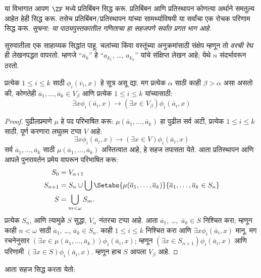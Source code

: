 \documentclass[../../../include/open-logic-section]{subfiles}
\begin{document}

या विभागात आपण $\ZF$ मध्ये प्रतिबिंबन सिद्ध करू. प्रतिबिंबन आणि प्रतिस्थापन कोणत्या अर्थाने समतुल्य आहेत हेही सिद्ध करू. तसेच प्रतिबिंबन/प्रतिस्थापन यांच्या सामर्थ्याविषयी या सर्वांचा एक रोचक परिणाम सिद्ध करू. \emph{सूचना: या पाठ्यपुस्तकातील गणिताचा हा सहजपणे सर्वांत प्रगत भाग आहे.}

सुरुवातीला एक साहाय्यक सिद्धांत पाहू. चलांच्या किंवा वस्तूंच्या अनुक्रमांसाठी संक्षेप म्हणून तो \emph{वरची रेघ} ही लेखनपद्धत वापरतो. म्हणजे ``$\overline{a}_k$'' हे ``$a_{k_1}$, \dots,
$a_{k_n}$'' यांचे संक्षिप्त लेखन आहे; येथे $n$ संदर्भावरून ठरतो.

\begin{lem}
प्रत्येक $1 \leq i \leq k$ साठी $\phi_i(\overline{v}_i, x)$ हे सूत्र असू द्या. मग प्रत्येक $\alpha$ साठी काही $\beta > \alpha$ असा असतो की, कोणतेही $\overline{a}_1,
\ldots, \overline{a}_k \in V_\beta$ आणि प्रत्येक $1 \leq i \leq k$ यांच्यासाठी:
\[
  \exists x\phi_i(\overline{a}_i, x) \rightarrow (\exists x \in V_\beta) \phi_i(\overline{a}_i, x)
\]
\end{lem}

\begin{proof}
पुढीलप्रमाणे $\mu$ हे पद परिभाषित करू: $\mu(\overline{a}_1, \ldots,
\overline{a}_k)$ हा पुढील सर्व अटी, प्रत्येक $1 \leq i \leq k$ साठी, पूर्ण करणारा लघुतम टप्पा $V$ आहे:
\[
\exists x\phi_i(\overline{a}_i, x) \rightarrow (\exists x \in V) \phi_i(\overline{a}_i, x)
\]
सर्व $\overline{a}_1, \ldots, \overline{a}_k$ साठी $\mu(\overline{a}_1, \ldots, \overline{a}_k)$ अस्तित्वात आहे, हे सहज तपासता येते. आता प्रतिस्थापन आणि आपले पुनरावर्तन प्रमेय वापरून परिभाषित करू:
\begin{align*}
  S_0 & = V_{\alpha+1}\\
  S_{n+1} & = S_n \cup \bigcup
  \Setabs{\mu(\overline{a}_1, \ldots, \overline{a}_k)}
  {\overline{a}_1, \ldots, \overline{a}_k \in S_n} \\
  S &= \bigcup_{m < \omega} S_m.
\end{align*}
प्रत्येक $S_n$, आणि त्यामुळे $S$ सुद्धा, $V_\alpha$ नंतरचा टप्पा आहे. आता $\overline{a}_1$, \dots,~$\overline{a}_k \in S$ निश्चित करा; म्हणून काही $n <
\omega$ साठी $\overline{a}_1$, \dots, $\overline{a}_k \in S_n$. काही $1 \leq i \leq k$ निश्चित करा आणि $\exists x
\phi_i(\overline{a}_i,x)$ मानू. मग रचनेनुसार $(\exists x \in \mu(\overline{a}_1,
\ldots, \overline{a}_k))\phi_i(\overline{a}_i, x)$; म्हणून $(\exists x \in S_{n+1})\phi_i(\overline{a}_i, x)$ आणि परिणामी $(\exists x \in S)\phi_i(\overline{a}_i, x)$. म्हणून हाच $S$ आपला $V_\beta$ आहे.
\end{proof}
\noindent
आता  सहज सिद्ध करता येतो:
\end{document}
